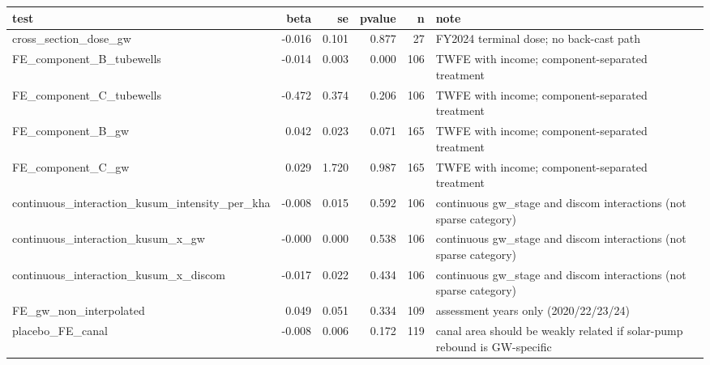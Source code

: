 \begin{tabular}{lrrrrl}
\toprule
test & beta & se & pvalue & n & note \\
\midrule
cross_section_dose_gw & -0.016 & 0.101 & 0.877 & 27 & FY2024 terminal dose; no back-cast path \\
FE_component_B_tubewells & -0.014 & 0.003 & 0.000 & 106 & TWFE with income; component-separated treatment \\
FE_component_C_tubewells & -0.472 & 0.374 & 0.206 & 106 & TWFE with income; component-separated treatment \\
FE_component_B_gw & 0.042 & 0.023 & 0.071 & 165 & TWFE with income; component-separated treatment \\
FE_component_C_gw & 0.029 & 1.720 & 0.987 & 165 & TWFE with income; component-separated treatment \\
continuous_interaction_kusum_intensity_per_kha & -0.008 & 0.015 & 0.592 & 106 & continuous gw_stage and discom interactions (not sparse category) \\
continuous_interaction_kusum_x_gw & -0.000 & 0.000 & 0.538 & 106 & continuous gw_stage and discom interactions (not sparse category) \\
continuous_interaction_kusum_x_discom & -0.017 & 0.022 & 0.434 & 106 & continuous gw_stage and discom interactions (not sparse category) \\
FE_gw_non_interpolated & 0.049 & 0.051 & 0.334 & 109 & assessment years only (2020/22/23/24) \\
placebo_FE_canal & -0.008 & 0.006 & 0.172 & 119 & canal area should be weakly related if solar-pump rebound is GW-specific \\
\bottomrule
\end{tabular}
